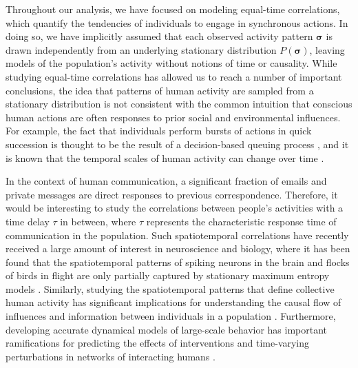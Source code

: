 \documentclass[aps,reprint,superscriptaddress,amsmath,amssymb,longbibliography]{revtex4-1}
\begin{document}
\label{Dynamic}

Throughout our analysis, we have focused on modeling equal-time correlations, which quantify the tendencies of individuals to engage in synchronous actions. In doing so, we have implicitly assumed that each observed activity pattern $\bm{\sigma}$ is drawn independently from an underlying stationary distribution $P(\bm{\sigma})$, leaving models of the population's activity without notions of time or causality. While studying equal-time correlations has allowed us to reach a number of important conclusions, the idea that patterns of human activity are sampled from a stationary distribution is not consistent with the common intuition that conscious human actions are often responses to prior social and environmental influences. For example, the fact that individuals perform bursts of actions in quick succession is thought to be the result of a decision-based queuing process \cite{Barabasi-01}, and it is known that the temporal scales of human activity can change over time \cite{Miritello-01,Borge-01,Navarro-01}.

In the context of human communication, a significant fraction of emails and private messages are direct responses to previous correspondence. Therefore, it would be interesting to study the correlations between people's activities with a time delay $\tau$ in between, where $\tau$ represents the characteristic response time of communication in the population. Such spatiotemporal correlations have recently received a large amount of interest in neuroscience and biology, where it has been found that the spatiotemporal patterns of spiking neurons in the brain and flocks of birds in flight are only partially captured by stationary maximum entropy models \cite{Tang-01,Marre-01,Cavagna-01}. Similarly, studying the spatiotemporal patterns that define collective human activity has significant implications for understanding the causal flow of influences and information between individuals in a population \cite{Navarro-01}. Furthermore, developing accurate dynamical models of large-scale behavior has important ramifications for predicting the effects of interventions and time-varying perturbations in networks of interacting humans \cite{Candia-01,Crane-01,Peng-01,Onnela-01,Gonzalez-01,Caldarelli-01,Pastor-01}.


\end{document}
